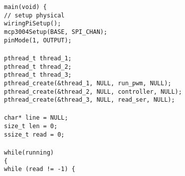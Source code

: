 \documentclass[a4paper, 12pt]{article}
\begin{document}
\begin{appendices}
	\texttt{main(void) \{ \\\noindent}
	\texttt{\hspace*{1em}// setup physical} \\\noindent
	\texttt{\hspace*{1em}wiringPiSetup();} \\\noindent
	\texttt{\hspace*{1em}mcp3004Setup(BASE, SPI\_CHAN);} \\\noindent
	\texttt{\hspace*{1em}pinMode(1, OUTPUT); } \\\noindent
	\texttt{\hspace*{1em}\\\noindent}
	\texttt{\hspace*{1em}pthread\_t thread\_1;} \\\noindent
	\texttt{\hspace*{1em}pthread\_t thread\_2;} \\\noindent
	\texttt{\hspace*{1em}pthread\_t thread\_3;} \\\noindent
	\texttt{\hspace*{1em}pthread\_create(\&thread\_1, NULL, run\_pwm, NULL);} \\\noindent
	\texttt{\hspace*{1em}pthread\_create(\&thread\_2, NULL, controller, NULL);} \\\noindent
	\texttt{\hspace*{1em}pthread\_create(\&thread\_3, NULL, read\_ser, NULL);} \\\noindent
	\texttt{\hspace*{1em}\\\noindent}
	\texttt{\hspace*{1em}char* line = NULL;} \\\noindent
	\texttt{\hspace*{1em}size\_t len = 0;} \\\noindent
	\texttt{\hspace*{1em}ssize\_t read = 0;} \\\noindent
	\texttt{\hspace*{1em}\\\noindent}
	\texttt{\hspace*{1em}while(running)} \\\noindent
	\texttt{\hspace*{2em}\{ \\\noindent}
	\texttt{\hspace*{2em}while (read != -1) \{ \\\noindent}

\end{appendices}
\end{document}
